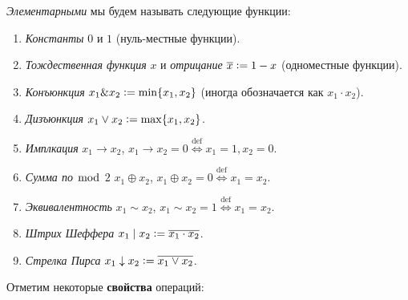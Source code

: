 \begin{definition}
    \textit{Элементарными} мы будем называть следующие функции:
    \begin{enumerate}[nolistsep]
        \item \textit{Константы} $0$ и $1$ (нуль-местные функции).
        \item \textit{Тождественная функция} $x$ и \textit{отрицание} $\overline{x} \vcentcolon = 1 - x$ (одноместные функции).
        \item \textit{Конъюнкция} $x_1 \& x_2 \vcentcolon = \min\{x_1, x_2\}$ (иногда обозначается как $x_1 \cdot x_2$).
        \item \textit{Дизъюнкция} $x_1 \vee x_2 \vcentcolon = \max\{x_1, x_2\}$.
        \item \textit{Имплкация} $x_1 \to x_2$, $x_1 \to x_2 = 0 \overset{\mathrm{def}}{\Longleftrightarrow} x_1 = 1, x_2 = 0$.
        \item \textit{Сумма по $\bmod$ $2$} $x_1 \oplus x_2$, $x_1 \oplus x_2 = 0 \overset{\mathrm{def}}{\Longleftrightarrow} x_1 = x_2$.
        \item \textit{Эквивалентность} $x_1 \sim x_2$, $x_1 \sim x_2 = 1 \overset{\mathrm{def}}{\Longleftrightarrow} x_1 = x_2$.
        \item \textit{Штрих Шеффера} $x_1 \mid x_2 \vcentcolon = \overline{x_1 \cdot x_2}$.
        \item \textit{Стрелка Пирса} $x_1 \downarrow x_2 \vcentcolon = \overline{x_1 \vee x_2}$.
    \end{enumerate}
\end{definition}
\newpage
\noindent Отметим некоторые \textbf{свойства} операций:
